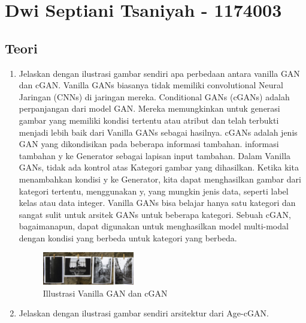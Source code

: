 \section{Dwi Septiani Tsaniyah - 1174003}

\subsection{Teori}
\begin{enumerate}
	\item Jelaskan dengan ilustrasi gambar sendiri apa perbedaan antara vanilla GAN dan cGAN.
	Vanilla GANs biasanya tidak memiliki convolutional Neural Jaringan (CNNs) di jaringan mereka. Conditional GANs (cGANs) adalah perpanjangan dari model GAN. Mereka memungkinkan untuk generasi gambar yang memiliki kondisi tertentu atau atribut dan telah terbukti menjadi lebih baik dari Vanilla GANs sebagai hasilnya. cGANs adalah jenis GAN yang dikondisikan pada beberapa informasi tambahan.  informasi tambahan y ke Generator sebagai lapisan input tambahan. Dalam Vanilla GANs, tidak ada kontrol atas Kategori gambar yang dihasilkan. Ketika kita menambahkan kondisi y ke Generator, kita dapat menghasilkan gambar dari kategori tertentu, menggunakan y, yang mungkin jenis data, seperti label kelas atau data integer. Vanilla GANs bisa belajar hanya satu kategori dan sangat sulit untuk arsitek GANs untuk beberapa kategori. Sebuah cGAN, bagaimanapun, dapat digunakan untuk menghasilkan model multi-modal dengan kondisi yang berbeda untuk kategori yang berbeda.

	\hfill \break
	\begin{figure}[H]
		\includegraphics[width=4cm]{figures/1174003/9/teori1.PNG}
		\centering
		\caption{Illustrasi Vanilla GAN dan cGAN}
	\end{figure}
	\item Jelaskan dengan ilustrasi gambar sendiri arsitektur dari Age-cGAN.
	\hfill \break
	

\end{enumerate}
